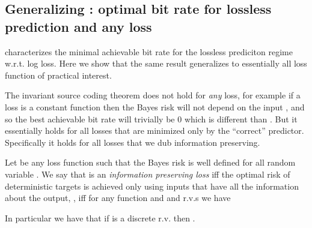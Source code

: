 \documentclass[final]{article}
\begin{document}
\subsection{Generalizing \texorpdfstring{}{Theorem 2}: optimal bit rate for lossless prediction and any loss}
\label{appx:theorem_lossless}



 characterizes the minimal achievable bit rate for the lossless prediciton regime w.r.t. log loss.
Here we show that the same result generalizes to essentially all loss function of practical interest.





The invariant source coding theorem does not hold for \textit{any} loss, for example if a loss is a constant function then the Bayes risk  will not depend on the input , and so the best achievable bit rate will trivially be 0 which is different than .
But it essentially holds for all losses that are minimized only by the ``correct'' predictor.
Specifically it holds for all losses that we dub information preserving.

\begin{definition}\label{def:meaningful}
Let  be any loss function such that the Bayes risk  is well defined for all random variable .
We say that  is an \textit{information preserving loss} iff the optimal risk of deterministic targets is achieved only using inputs that have all the information about the output, \ie, iff for any function  and and r.v.s  we have

\end{definition}



In particular we have that if  is a discrete r.v. then .
\end{document}
